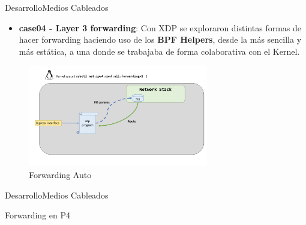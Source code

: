 \documentclass[10pt,compress,xcolor=table]{beamer} %
\begin{document}
\begin{frame}{Desarrollo}{Medios Cableados}
\begin{itemize}
    \item \textbf{case04 -  Layer 3 forwarding}:  Con XDP se exploraron distintas formas de hacer forwarding haciendo uso de los \textbf{BPF Helpers}, desde la más sencilla y más estática, a una donde se trabajaba de forma colaborativa con  el Kernel.
\end{itemize}

\begin{figure}
\includegraphics[width=0.7\textwidth]{img/6.png}
\caption{Forwarding Auto}
\end{figure}
        


\end{frame}

\begin{frame}{Desarrollo}{Medios Cableados}

\begin{block}{Forwarding en P4}
 \vspace{-0.2cm}
 
\end{block}
\end{frame}
\end{document}
